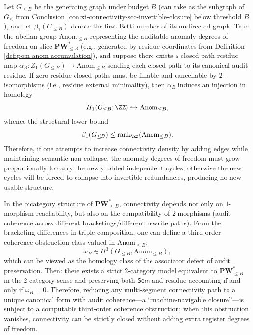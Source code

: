 \begin{conclusion}\label{con:xi-connectivity-betti-lower-bound-by-anom-rank}
Let \(G_{\le B}\) be the generating graph under budget \(B\) (can take as the subgraph of \(G_{\le}\) from Conclusion \ref{con:xi-connectivity-scc-invertible-closure} below threshold \(B\)), and let \(\beta_1(G_{\le B})\) denote the first Betti number of its undirected graph.
Take the abelian group \(\mathrm{Anom}_{\le B}\) representing the auditable anomaly degrees of freedom on slice \(\mathbf{PW}^{\ast}_{\le B}\) (e.g., generated by residue coordinates from Definition \ref{def:pom-anom-accumulation}), and suppose there exists a closed-path residue map
\(
\alpha_B:Z_1(G_{\le B})\to \mathrm{Anom}_{\le B}
\)
sending each closed path to its canonical audit residue.
If zero-residue closed paths must be fillable and cancellable by \(2\)-isomorphisms (i.e., residue external minimality), then \(\alpha_B\) induces an injection in homology
\[
H_1(G_{\le B};\ZZ)\hookrightarrow \mathrm{Anom}_{\le B},
\]
whence the structural lower bound
\[
\beta_1(G_{\le B})\le \mathrm{rank}_{\ZZ}(\mathrm{Anom}_{\le B}).
\]
Therefore, if one attempts to increase connectivity density by adding edges while maintaining semantic non-collapse, the anomaly degrees of freedom must grow proportionally to carry the newly added independent cycles; otherwise the new cycles will be forced to collapse into invertible redundancies, producing no new usable structure.
\end{conclusion}

\begin{conclusion}\label{con:xi-connectivity-third-order-strictification-obstruction}
In the bicategory structure of \(\mathbf{PW}^{\ast}_{\le B}\), connectivity depends not only on \(1\)-morphism reachability, but also on the compatibility of \(2\)-morphisms (audit coherence across different bracketings/different rewrite paths).
From the bracketing differences in triple composition, one can define a third-order coherence obstruction class valued in \(\mathrm{Anom}_{\le B}\):
\[
\omega_B\in H^3(G_{\le B};\mathrm{Anom}_{\le B}),
\]
which can be viewed as the homology class of the associator defect of audit preservation.
Then: there exists a strict \(2\)-category model equivalent to \(\mathbf{PW}^{\ast}_{\le B}\) in the \(2\)-category sense and preserving both \(\mathsf{Sem}\) and residue accounting if and only if \(\omega_B=0\).
Therefore, reducing any multi-segment connectivity path to a unique canonical form with audit coherence---a ``machine-navigable closure''---is subject to a computable third-order coherence obstruction; when this obstruction vanishes, connectivity can be strictly closed without adding extra register degrees of freedom.
\end{conclusion}

